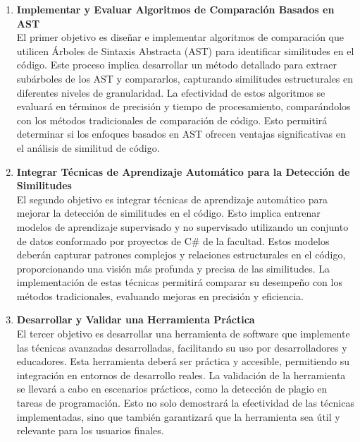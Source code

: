 \renewcommand{\labelenumi}{\Roman{enumi}.}
\begin{enumerate}
	\item {\bf Implementar y Evaluar Algoritmos de Comparación Basados en AST}\\
	El primer objetivo es diseñar e implementar algoritmos de comparación que utilicen Árboles de Sintaxis Abstracta (AST) para identificar similitudes en el código. Este proceso implica desarrollar un método detallado para extraer subárboles de los AST y compararlos, capturando similitudes estructurales en diferentes niveles de granularidad. La efectividad de estos algoritmos se evaluará en términos de precisión y tiempo de procesamiento, comparándolos con los métodos tradicionales de comparación de código. Esto permitirá determinar si los enfoques basados en AST ofrecen ventajas significativas en el análisis de similitud de código.
	
	\item {\bf Integrar Técnicas de Aprendizaje Automático para la Detección de Similitudes} \\
El segundo objetivo es integrar técnicas de aprendizaje automático para mejorar la detección de similitudes en el código. Esto implica entrenar modelos de aprendizaje supervisado y no supervisado utilizando un conjunto de datos conformado por proyectos de C# de la facultad. Estos modelos deberán capturar patrones complejos y relaciones estructurales en el código, proporcionando una visión más profunda y precisa de las similitudes. La implementación de estas técnicas permitirá comparar su desempeño con los métodos tradicionales, evaluando mejoras en precisión y eficiencia.

	\item {\bf Desarrollar y Validar una Herramienta Práctica} \\
El tercer objetivo es desarrollar una herramienta de software que implemente las técnicas avanzadas desarrolladas, facilitando su uso por desarrolladores y educadores. Esta herramienta deberá ser práctica y accesible, permitiendo su integración en entornos de desarrollo reales. La validación de la herramienta se llevará a cabo en escenarios prácticos, como la detección de plagio en tareas de programación. Esto no solo demostrará la efectividad de las técnicas implementadas, sino que también garantizará que la herramienta sea útil y relevante para los usuarios finales.


\end{enumerate}
